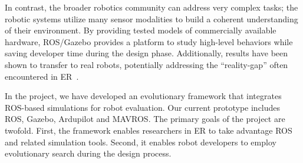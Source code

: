 In contrast, the broader robotics community can address very complex tasks; the robotic systems utilize many sensor modalities to build a coherent understanding of their environment.
%
By providing tested models of commercially available hardware, ROS/Gazebo provides a platform to study high-level behaviors while saving developer time during the design phase.  
%
Additionally, results have been shown to transfer to real robots, potentially addressing the ``reality-gap'' often encountered in ER~\cite{Koos2010}.  

In the {\project} project, we have developed an evolutionary framework that integrates ROS-based simulations for robot evaluation.  
%
Our current prototype includes ROS, Gazebo, Ardupilot and MAVROS.    
%
The primary goals of the project are twofold. 
%
First, the framework enables researchers in ER to take advantage ROS and related simulation tools.
%
Second, it enables robot developers to employ evolutionary search during the design process.

%
%


